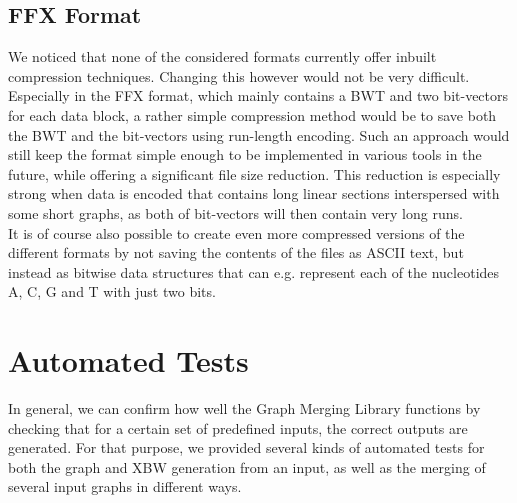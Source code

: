\documentclass[a4paper,12pt,twoside,BCOR=10mm]{scrbook}
\begin{document}

\subsection{FFX Format}


We noticed that none of the considered formats currently offer inbuilt compression techniques. 
Changing this however would not be very difficult. Especially in the FFX format, 
which mainly contains a BWT and two bit-vectors for each data block, 
a rather simple compression method would be to save both the BWT and the bit-vectors 
using run-length encoding. 
Such an approach would still keep the format simple enough to be implemented in various 
tools in the future, while offering a significant file size reduction. 
This reduction is especially strong when data is encoded that contains long linear sections 
interspersed with some short graphs, as both of bit-vectors will then 
contain very long runs. \\
It is of course also possible to create even more compressed versions 
of the different formats by not saving the contents of the files as ASCII text, 
but instead as bitwise data structures that can e.g. represent each of the nucleotides A, C, G and T with 
just two bits.

\section{Automated Tests}
%

In general, we can confirm how well the Graph Merging Library functions by checking 
that for a certain set of predefined inputs, the correct outputs are generated. 
For that purpose, we provided several kinds of automated tests for both the 
graph and XBW generation from an input, as well as the merging of several input graphs 
in different ways.
\end{document}
